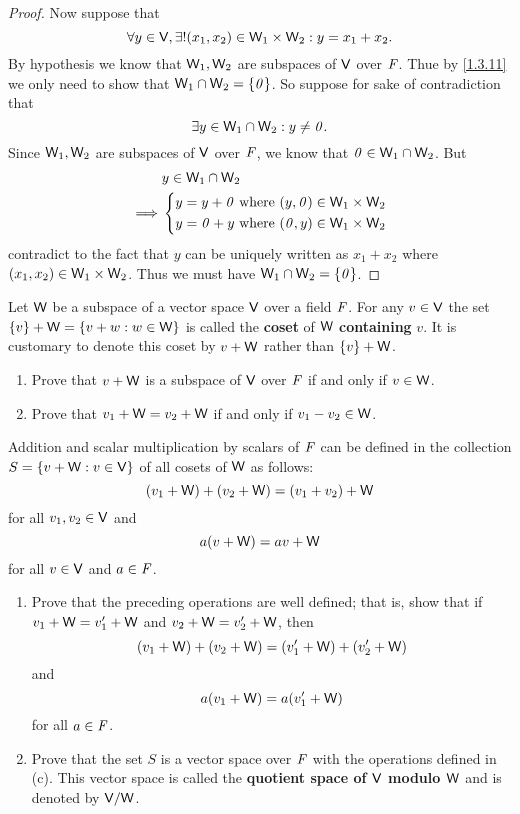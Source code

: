 \begin{proof}
  Now suppose that
  \[
    \forall y \in \mathsf{V}, \exists! (x_1, x_2) \in \mathsf{W}_1 \times \mathsf{W}_2 : y = x_1 + x_2.
  \]
  By hypothesis we know that \(\mathsf{W}_1, \mathsf{W}_2\) are subspaces of \(\mathsf{V}\) over \(\mathit{F}\).
  Thue by \cref{1.3.11} we only need to show that \(\mathsf{W}_1 \cap \mathsf{W}_2 = \left\lbrace\mathit{0}\right\rbrace\).
  So suppose for sake of contradiction that
  \[
    \exists y \in \mathsf{W}_1 \cap \mathsf{W}_2 : y \neq \mathit{0}.
  \]
  Since \(\mathsf{W}_1, \mathsf{W}_2\) are subspaces of \(\mathsf{V}\) over \(\mathit{F}\), we know that \(\mathit{0} \in \mathsf{W}_1 \cap \mathsf{W}_2\).
  But
  \begin{align*}
             & y \in \mathsf{W}_1 \cap \mathsf{W}_2        \\
    \implies & \begin{dcases}
      y = y + \mathit{0} \text{ where } (y, \mathit{0}) \in \mathsf{W}_1 \times \mathsf{W}_2 \\
      y = \mathit{0} + y \text{ where } (\mathit{0}, y) \in \mathsf{W}_1 \times \mathsf{W}_2
    \end{dcases}
  \end{align*}
  contradict to the fact that \(y\) can be uniquely written as \(x_1 + x_2\) where \((x_1, x_2) \in \mathsf{W}_1 \times \mathsf{W}_2\).
  Thus we must have \(\mathsf{W}_1 \cap \mathsf{W}_2 = \left\lbrace\mathit{0}\right\rbrace\).
\end{proof}

\begin{ex}\label{ex:1.3.31}
  Let \(\mathsf{W}\) be a subspace of a vector space \(\mathsf{V}\) over a field \(\mathit{F}\).
  For any \(v \in \mathsf{V}\) the set \(\left\lbrace v\right\rbrace + \mathsf{W} = \left\lbrace v + w : w \in \mathsf{W}\right\rbrace\) is called the \textbf{coset} of \(\mathsf{W}\) \textbf{containing} \(v\).
  It is customary to denote this coset by \(v + \mathsf{W}\) rather than \(\left\lbrace v\right\rbrace + \mathsf{W}\).
  \begin{enumerate}
    \item Prove that \(v + \mathsf{W}\) is a subspace of \(\mathsf{V}\) over \(\mathit{F}\) if and only if \(v \in \mathsf{W}\).
    \item Prove that \(v_1 + \mathsf{W} = v_2 + \mathsf{W}\) if and only if \(v_1 - v_2 \in \mathsf{W}\).
  \end{enumerate}
  Addition and scalar multiplication by scalars of \(\mathit{F}\) can be defined in the collection \(S = \left\lbrace v + \mathsf{W} : v \in \mathsf{V}\right\rbrace\) of all cosets of \(\mathsf{W}\) as follows:
  \[
    (v_1 + \mathsf{W}) + (v_2 + \mathsf{W}) = (v_1 + v_2) + \mathsf{W}
  \]
  for all \(v_1, v_2 \in \mathsf{V}\) and
  \[
    a(v + \mathsf{W}) = av + \mathsf{W}
  \]
  for all \(v \in \mathsf{V}\) and \(a \in \mathit{F}\).
  \begin{enumerate}[resume]
    \item Prove that the preceding operations are well defined;
          that is, show that if \(v_1 + \mathsf{W} = v_1' + \mathsf{W}\) and \(v_2 + \mathsf{W} = v_2' + \mathsf{W}\), then
          \[
            (v_1 + \mathsf{W}) + (v_2 + \mathsf{W}) = (v_1' + \mathsf{W}) + (v_2' + \mathsf{W})
          \]
          and
          \[
            a(v_1 + \mathsf{W}) = a(v_1' + \mathsf{W})
          \]
          for all \(a \in \mathit{F}\).
    \item Prove that the set \(S\) is a vector space over \(\mathit{F}\) with the operations defined in (c).
          This vector space is called the \textbf{quotient space of \(\mathsf{V}\) modulo \(\mathsf{W}\)} and is denoted by \(\mathsf{V} / \mathsf{W}\).
  \end{enumerate}
\end{ex}

